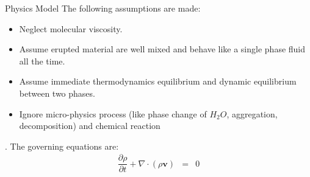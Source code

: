\documentclass[final]{beamer}
\newlength{\onecolwid}
\begin{document}
\begin{frame}[t]
\begin{columns}[t]
\begin{column}{\onecolwid}

\begin{block}{Physics Model \cite{suzuki2005numerical}}
The following assumptions are made:
\begin{itemize}
\item Neglect molecular viscosity.
\item Assume erupted material are well mixed and behave like a single phase fluid all the time.
\item Assume immediate thermodynamics equilibrium and dynamic equilibrium between two phases.
\item Ignore micro-physics process (like phase change of $H_2O$, aggregation, decomposition) and chemical reaction
\end{itemize}.
The governing equations are:
\begin{eqnarray} %
\dfrac{\partial \rho}{\partial t} + \nabla \cdot (\rho \textbf{v}) &=& 0 \label{eq:gov-cs-rho} \\

\end{eqnarray}
\end{block}
\end{column}
\end{columns}
\end{frame}
\end{document}
